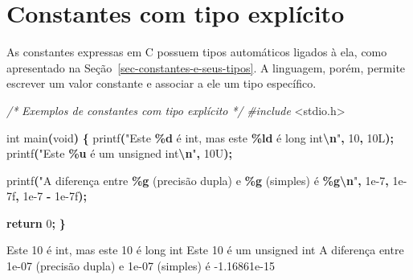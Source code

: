 \documentclass[
  11pt,
  a4paper,
]{scrbook}
\newenvironment{Shaded}{\begin{snugshade}}{\end{snugshade}}
\newcommand{\BuiltInTok}[1]{#1}
\newcommand{\CommentTok}[1]{\textcolor[rgb]{0.56,0.35,0.01}{\textit{#1}}}
\newcommand{\ControlFlowTok}[1]{\textcolor[rgb]{0.13,0.29,0.53}{\textbf{#1}}}
\newcommand{\DataTypeTok}[1]{\textcolor[rgb]{0.13,0.29,0.53}{#1}}
\newcommand{\DecValTok}[1]{\textcolor[rgb]{0.00,0.00,0.81}{#1}}
\newcommand{\FloatTok}[1]{\textcolor[rgb]{0.00,0.00,0.81}{#1}}
\newcommand{\ImportTok}[1]{#1}
\newcommand{\NormalTok}[1]{#1}
\newcommand{\OperatorTok}[1]{\textcolor[rgb]{0.81,0.36,0.00}{\textbf{#1}}}
\newcommand{\PreprocessorTok}[1]{\textcolor[rgb]{0.56,0.35,0.01}{\textit{#1}}}
\newcommand{\SpecialCharTok}[1]{\textcolor[rgb]{0.81,0.36,0.00}{\textbf{#1}}}
\newcommand{\StringTok}[1]{\textcolor[rgb]{0.31,0.60,0.02}{#1}}
\begin{document}
\section{Constantes com tipo
explícito}\label{sec-constante-com-tipo-explicito}

As constantes expressas em C possuem tipos automáticos ligados à ela,
como apresentado na Seção~\ref{sec-constantes-e-seus-tipos}. A
linguagem, porém, permite escrever um valor constante e associar a ele
um tipo específico.

\begin{Shaded}
\begin{Highlighting}[]
\CommentTok{/*}
\CommentTok{Exemplos de constantes com tipo explícito}
\CommentTok{*/}
\PreprocessorTok{\#include }\ImportTok{\textless{}stdio.h\textgreater{}}

\DataTypeTok{int}\NormalTok{ main}\OperatorTok{(}\DataTypeTok{void}\OperatorTok{)} \OperatorTok{\{}
\NormalTok{    printf}\OperatorTok{(}\StringTok{"Este }\SpecialCharTok{\%d}\StringTok{ é int, mas este }\SpecialCharTok{\%ld}\StringTok{ é long int}\SpecialCharTok{\textbackslash{}n}\StringTok{"}\OperatorTok{,} \DecValTok{10}\OperatorTok{,} \DecValTok{10}\BuiltInTok{L}\OperatorTok{);}
\NormalTok{    printf}\OperatorTok{(}\StringTok{"Este }\SpecialCharTok{\%u}\StringTok{ é um unsigned int}\SpecialCharTok{\textbackslash{}n}\StringTok{"}\OperatorTok{,} \DecValTok{10}\BuiltInTok{U}\OperatorTok{);}

\NormalTok{    printf}\OperatorTok{(}\StringTok{"A diferença entre }\SpecialCharTok{\%g}\StringTok{ (precisão dupla) e }\SpecialCharTok{\%g}\StringTok{ (simples) é }\SpecialCharTok{\%g\textbackslash{}n}\StringTok{"}\OperatorTok{,}
        \FloatTok{1e{-}7}\OperatorTok{,} \FloatTok{1e{-}7}\BuiltInTok{f}\OperatorTok{,} \FloatTok{1e{-}7} \OperatorTok{{-}} \FloatTok{1e{-}7}\BuiltInTok{f}\OperatorTok{);}

    \ControlFlowTok{return} \DecValTok{0}\OperatorTok{;}
\OperatorTok{\}}
\end{Highlighting}
\end{Shaded}

\begin{Shaded}
\begin{Highlighting}[]
\NormalTok{Este 10 é int, mas este 10 é long int}
\NormalTok{Este 10 é um unsigned int}
\NormalTok{A diferença entre 1e{-}07 (precisão dupla) e 1e{-}07 (simples) é {-}1.16861e{-}15}
\end{Highlighting}
\end{Shaded}
\end{document}
